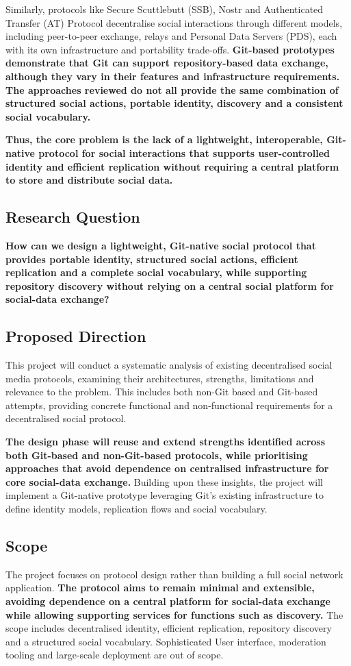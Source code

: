 Similarly, protocols like Secure Scuttlebutt (SSB), Nostr and Authenticated Transfer (AT) Protocol decentralise social interactions through different models, including peer-to-peer exchange, relays and Personal Data Servers (PDS), each with its own infrastructure and portability trade-offs. \textbf{Git-based prototypes demonstrate that Git can support repository-based data exchange, although they vary in their features and infrastructure requirements.} \textbf{The approaches reviewed do not all provide the same combination of structured social actions, portable identity, discovery and a consistent social vocabulary.}

\textbf{Thus, the core problem is the lack of a lightweight, interoperable, Git-native protocol for social interactions that supports user-controlled identity and efficient replication without requiring a central platform to store and distribute social data.}


\subsection{Research Question}
\textbf{How can we design a lightweight, Git-native social protocol that provides portable identity, structured social actions, efficient replication and a complete social vocabulary, while supporting repository discovery without relying on a central social platform for social-data exchange?}


\subsection{Proposed Direction}
This project will conduct a systematic analysis of existing decentralised social media protocols, examining their architectures, strengths, limitations and relevance to the problem. 
This includes both non-Git based and Git-based attempts, providing concrete functional and non-functional requirements for a decentralised social protocol. 

\textbf{The design phase will reuse and extend strengths identified across both Git-based and non-Git-based protocols, while prioritising approaches that avoid dependence on centralised infrastructure for core social-data exchange.} Building upon these insights, the project will implement a Git-native prototype leveraging Git’s existing infrastructure to define identity models, replication flows and social vocabulary.

\subsection{Scope}
The project focuses on protocol design rather than building a full social network application. \textbf{The protocol aims to remain minimal and extensible, avoiding dependence on a central platform for social-data exchange while allowing supporting services for functions such as discovery.} The scope includes decentralised identity, efficient replication, repository discovery and a structured social vocabulary. Sophisticated User interface, moderation tooling and large-scale deployment are out of scope.
